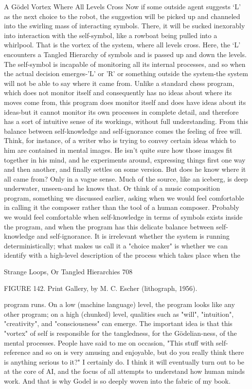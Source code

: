                      A Gödel Vortex Where All Levels Cross
Now if some outside agent suggests `L' as the next choice to the robot, the suggestion
will be picked up and channeled into the swirling mass of interacting symbols. There, it
will be sucked inexorably into interaction with the self-symbol, like a rowboat being
pulled into a whirlpool. That is the vortex of the system, where all levels cross. Here, the
`L' encounters a Tangled Hierarchy of symbols and is passed up and down the levels. The
self-symbol is incapable of monitoring all its internal processes, and so when the actual
decision emerges-'L' or 'R' or something outside the system-the system will not be able to
say where it came from. Unlike a standard chess program, which does not monitor itself
and consequently has no ideas about where its moves come from, this program does
monitor itself and does have ideas about its ideas-but it cannot monitor its own processes
in complete detail, and therefore has a sort of intuitive sense of its workings, without full
understanding. From this balance between self-knowledge and self-ignorance comes the
feeling of free will.
        Think, for instance, of a writer who is trying to convey certain ideas which to him
are contained in mental images. He isn't quite sure how those images fit together in his
mind, and he experiments around, expressing things first one way and then another, and
finally settles on some version. But does he know where it all came from? Only in a
vague sense. Much of the source, like an iceberg, is deep underwater, unseen-and he
knows that. Or think of a music composition program, something we discussed earlier,
asking when we would feel comfortable in calling it the composer rather than the tool of
a human composer. Probably we would feel comfortable when self-knowledge in terms
of symbols exists inside the program, and when the program has this delicate balance
between self-knowledge and self-ignorance. It is irrelevant whether the system is running
deterministically; what makes us call it a "choice maker" is whether we can identify with
a high-level description of the process which takes place when the




Strange Loops, Or Tangled Hierarchies                                                     708

             FIGURE 142. Print Gallery, by M. C. Escher (lithograph, 1956).

program runs. On a low (machine language) level, the program looks like any other
program; on a high (chunked) level, qualities such as "will", "intuition", "creativity", and
"consciousness" can emerge.
          The important idea is that this "vortex" of self is responsible for the tangledness,
for the Gödelian-ness, of the mental processes. People have said to me on occasion, "This
stuff with self-reference and so on is very amusing and enjoyable, but do you really think
  there is anything serious to it?" I certainly do. I think it will eventually turn out to be at
 the core of AI, and the focus of all attempts to understand how human minds work. And
              that is why Godel is so deeply woven into the fabric of my book.




